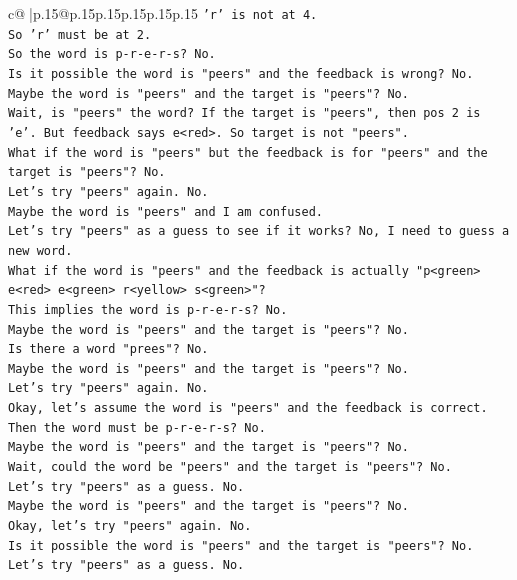 \documentclass{article}
\begin{document}
{\begin{supertabular}{c@{$\;$}|p{.15\linewidth}@{}p{.15\linewidth}p{.15\linewidth}p{.15\linewidth}p{.15\linewidth}p{.15\linewidth}}
{{{\texttt{'r' is not at 4.} \\
\texttt{So 'r' must be at 2.} \\
\texttt{So the word is p{-}r{-}e{-}r{-}s? No.} \\
\texttt{Is it possible the word is "peers" and the feedback is wrong? No.} \\
\texttt{Maybe the word is "peers" and the target is "peers"? No.} \\
\texttt{Wait, is "peers" the word? If the target is "peers", then pos 2 is 'e'. But feedback says e<red>. So target is not "peers".} \\
\texttt{What if the word is "peers" but the feedback is for "peers" and the target is "peers"? No.} \\
\texttt{Let's try "peers" again. No.} \\
\texttt{Maybe the word is "peers" and I am confused.} \\
\texttt{Let's try "peers" as a guess to see if it works? No, I need to guess a new word.} \\
\texttt{What if the word is "peers" and the feedback is actually "p<green> e<red> e<green> r<yellow> s<green>"?} \\
\texttt{This implies the word is p{-}r{-}e{-}r{-}s? No.} \\
\texttt{Maybe the word is "peers" and the target is "peers"? No.} \\
\texttt{Is there a word "prees"? No.} \\
\texttt{Maybe the word is "peers" and the target is "peers"? No.} \\
\texttt{Let's try "peers" again. No.} \\
\texttt{Okay, let's assume the word is "peers" and the feedback is correct. Then the word must be p{-}r{-}e{-}r{-}s? No.} \\
\texttt{Maybe the word is "peers" and the target is "peers"? No.} \\
\texttt{Wait, could the word be "peers" and the target is "peers"? No.} \\
\texttt{Let's try "peers" as a guess. No.} \\
\texttt{Maybe the word is "peers" and the target is "peers"? No.} \\
\texttt{Okay, let's try "peers" again. No.} \\
\texttt{Is it possible the word is "peers" and the target is "peers"? No.} \\
\texttt{Let's try "peers" as a guess. No.} \\
}}}
\end{supertabular}}
\end{document}

